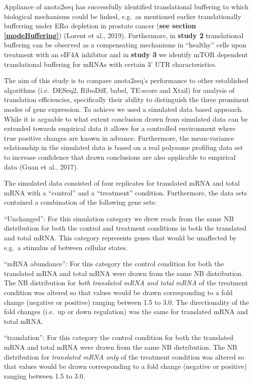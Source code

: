 \documentclass[
  12pt,
  openany]{book}
\begin{document}
Appliance of anota2seq has successfully identified translational buffering to which biological mechanisms could be linked, e.g.~as mentioned earlier translationally bufferring under ER\(\alpha\) depletion in prostate cancer (\textbf{see section \ref{modeBuffering}}) (Lorent et al., 2019). Furthermore, in \textbf{study 2} translational buffering can be observed as a compensating mechanisms in ``healthy'' cells upon treatment with an eIF4A inhibitor and in \textbf{study 3} we identify mTOR dependent translational buffering for mRNAs with certain 3' UTR characteristics.

The aim of this study is to compare anota2seq's performance to other established algorithms (i.e.~DESeq2, RiboDiff, babel, TE-score and Xtail) for analysis of translation efficiencies, specifically their ability to distinguish the three prominent modes of gene expression. To achieve we used a simulated data based approach. While it is arguable to what extent conclusion drawn from simulated data can be extended towards empirical data it allows for a controlled environment where true positive changes are known in advance. Furthermore, the mean-variance relationship in the simulated data is based on a real polysome profiling data set to increase confidence that drawn conclusions are also applicable to empirical data (Guan et al., 2017).

The simulated data consisted of four replicates for translated mRNA and total mRNA with a ``control'' and a ``treatment'' condition. Furthermore, the data sets contained a combination of the following gene sets:

``Unchanged'': For this simulation category we drew reads from the same NB distribution for both the control and treatment conditions in both the translated and total mRNA. This category represents genes that would be unaffected by e.g.~a stimulus of between cellular states.

``mRNA abundance'': For this category the control condition for both the translated mRNA and total mRNA were drawn from the same NB distribution. The NB distribution for \emph{both translated mRNA and total mRNA} of the treatment condition was altered so that values would be drawn corresponding to a fold change (negative or positive) ranging between 1.5 to 3.0. The directionality of the fold changes (i.e.~up or down regulation) was the same for translated mRNA and total mRNA.

``translation'': For this category the control condition for both the translated mRNA and total mRNA were drawn from the same NB distribution. The NB distribution for \emph{translated mRNA only} of the treatment condition was altered so that values would be drawn corresponding to a fold change (negative or positive) ranging between 1.5 to 3.0.
\end{document}
